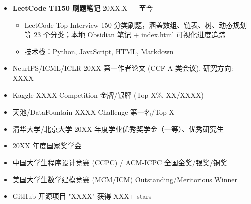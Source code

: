 \documentclass[zh]{resume}
\begin{document}
\begin{itemize}
    技术栈：TypeScript, Python, Pandas, NumPy, scikit-learn \\
    项目地址：\url{https://github.com/dok4everak47/agent-harness-analysis}


    \item \textbf{LeetCode TI150 刷题笔记} \hfill 20XX.X --- 至今
    \begin{itemize}
        \item LeetCode Top Interview 150 分类刷题，涵盖数组、链表、树、动态规划等 23 个分类；本地 Obsidian 笔记 + index.html 可视化进度追踪
        \item 技术栈：Python, JavaScript, HTML, Markdown
    \end{itemize}
\end{itemize}

\begin{itemize}
    \item NeurIPS/ICML/ICLR 20XX 第一作者论文 (CCF-A 类会议), 研究方向: XXXX
    \item Kaggle XXXX Competition 金牌/银牌 (Top X\%, XX/XXXX)
    \item 天池/DataFountain XXXX Challenge 第一名/Top X
    \item 清华大学/北京大学 20XX 年度学业优秀奖学金（一等）、优秀研究生
    \item 20XX 年度国家奖学金
    \item 中国大学生程序设计竞赛 (CCPC) / ACM-ICPC 全国金奖/银奖/铜奖
    \item 美国大学生数学建模竞赛 (MCM/ICM) Outstanding/Meritorious Winner
    \item GitHub 开源项目 "XXXX" 获得 XXX+ stars
\end{itemize}
\end{document}
